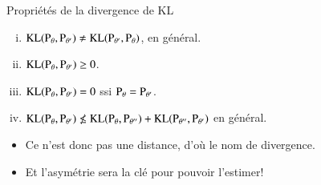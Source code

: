 \begin{frame}
    [allowframebreaks]{Propriétés de la divergence de KL}
    \begin{enumerate}[i)]
        \item $\operatorname{KL}(\operatorname{P}_\theta, \operatorname{P}_{\theta^\prime}) 
        \neq \operatorname{KL}( \operatorname{P}_{\theta^\prime}, \operatorname{P}_\theta)$, en général.
        \item $\operatorname{KL}(\operatorname{P}_\theta, \operatorname{P}_{\theta^\prime}) \geq 0 $.
        \item $\operatorname{KL}(\operatorname{P}_\theta, \operatorname{P}_{\theta^\prime}) = 0$ ssi $\operatorname{P}_\theta = \operatorname{P}_{\theta^\prime}$.
        \item $\operatorname{KL}(\operatorname{P}_\theta, \operatorname{P}_{\theta^\prime}) \nleq 
        \operatorname{KL}(\operatorname{P}_\theta, \operatorname{P}_{\theta^{\prime\prime}}) +
        \operatorname{KL}( \operatorname{P}_{\theta^{\prime\prime}}, \operatorname{P}_{\theta^\prime})$ en général.
    \end{enumerate}
\begin{itemize}
    \item Ce n'est donc pas une distance, d'où le nom de divergence.
    \item Et l'asymétrie sera la clé pour pouvoir l'estimer!
\end{itemize}
\end{frame}

